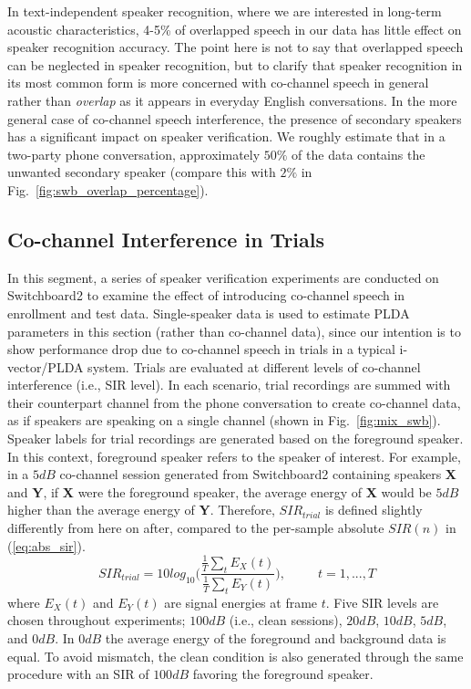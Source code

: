\documentclass[journal]{IEEEtran}
\begin{document}
In text-independent speaker recognition, where we are interested in long-term acoustic characteristics, 4-5\% of overlapped speech in our data has little effect on speaker recognition accuracy. The point here is not to say that overlapped speech can be neglected in speaker recognition, but to clarify that speaker recognition in its most common form is more concerned with co-channel speech in general rather than {\it overlap} as it appears in everyday English conversations. 
In the more general case of co-channel speech interference, the presence of secondary speakers has a significant impact on speaker verification. 
We roughly estimate that in a two-party phone conversation, approximately $50\%$ of the data contains the unwanted secondary speaker (compare this with $2\%$ in Fig.~\ref{fig:swb_overlap_percentage}). 


\subsection{Co-channel Interference in Trials}

In this segment, a series of speaker verification experiments are conducted on Switchboard2 to examine the effect of introducing co-channel speech in enrollment and test data. 
Single-speaker data is used to estimate PLDA parameters in this section (rather than co-channel data), since our intention is to show performance drop due to co-channel speech in trials in a typical i-vector/PLDA system. 
Trials are evaluated at different levels of co-channel interference (i.e., SIR level). 
In each scenario, trial recordings are summed with their counterpart channel from the phone conversation to create co-channel data, as if speakers are speaking on a single channel (shown in Fig.~\ref{fig:mix_swb}). 
Speaker labels for trial recordings are generated based on the foreground speaker. 
In this context, foreground speaker refers to the speaker of interest. 
For example, in a $5dB$ co-channel session generated from Switchboard2 containing speakers {\bf X} and {\bf Y}, if {\bf X} were the foreground speaker, the average energy of {\bf X} would be $5dB$ higher than the average energy of {\bf Y}. 
Therefore, $SIR_{trial}$ is defined slightly differently from here on after, compared to the per-sample absolute $SIR(n)$ in (\ref{eq:abs_sir}). 
\begin{equation} 
SIR_{trial} = 10log_{10}\Big(\frac{\frac{1}{T}\sum_t E_X(t)}{\frac{1}{T}\sum_t E_Y(t)}\Big), \hspace{30pt} t=1,...,T
\end{equation}
where $E_X(t)$ and $E_Y(t)$ are signal energies at frame $t$. 
Five SIR levels are chosen throughout experiments; $100dB$ (i.e., clean sessions), $20dB$, $10dB$, $5dB$, and $0dB$. 
In $0dB$ the average energy of the foreground and background data is equal. 
To avoid mismatch, the clean condition is also generated through the same procedure with an SIR of $100dB$ favoring the foreground speaker. 
\end{document}
